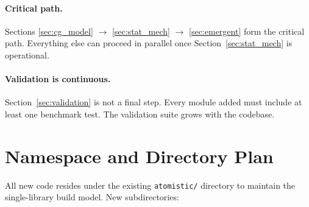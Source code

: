 \documentclass[11pt]{article}
\newcommand{\file}[1]{\texttt{#1}}
\begin{document}
\paragraph{Critical path.}
Sections \ref{sec:cg_model} $\to$ \ref{sec:stat_mech} $\to$
\ref{sec:emergent} form the critical path.  Everything else can proceed in
parallel once Section~\ref{sec:stat_mech} is operational.

\paragraph{Validation is continuous.}
Section~\ref{sec:validation} is not a final step.  Every module added must
include at least one benchmark test.  The validation suite grows with the
codebase.

\section{Namespace and Directory Plan}

All new code resides under the existing \file{atomistic/} directory to
maintain the single-library build model.  New subdirectories:
\end{document}
